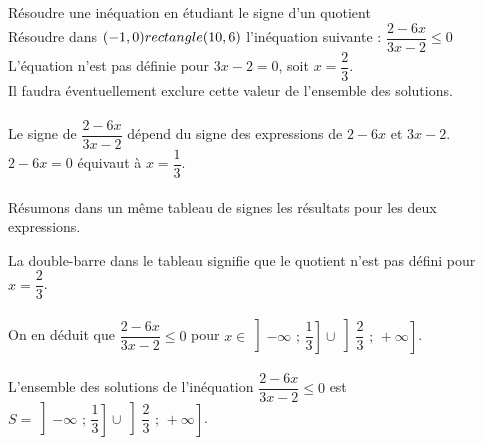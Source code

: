 \begin{Méthode}Résoudre une inéquation en étudiant le signe d'un quotient \\
Résoudre dans $(-1,0) rectangle (10,6)$ l'inéquation suivante : $\dfrac{2-6x}{3x-2}\leq 0$\\
L'équation n'est pas définie pour $3x-2=0$, soit $x=\dfrac{2}{3}$.\\
Il faudra éventuellement exclure cette valeur de l'ensemble des solutions. \\
~\\
Le signe de $\dfrac{2-6x}{3x-2}$ dépend du signe des expressions de $2-6x$ et $3x-2$. $2-6x=0$ équivaut à $x=\dfrac{1}{3}$.\\
~\\
Résumons dans un même tableau de signes les résultats pour les deux expressions. \\

\begin{center}
      \end{center}


\noindent La double-barre dans le tableau signifie que le quotient n'est pas défini pour $x=\dfrac{2}{3}$.\\
~\\
On en déduit que $\dfrac{2-6x}{3x-2}\leq 0$ pour $x\in \left] -\infty \text{ ; } \dfrac{1}{3}\right] \cup \left] \dfrac{2}{3} \text{ ; } +\infty \right]$.\\
~\\
L'ensemble des solutions de l'inéquation $\dfrac{2-6x}{3x-2}\leq 0$ est $S= \left] -\infty \text{ ; } \dfrac{1}{3}\right] \cup \left] \dfrac{2}{3} \text{ ; } +\infty \right]$.

\end{Méthode}

\bigskip

\newpage

